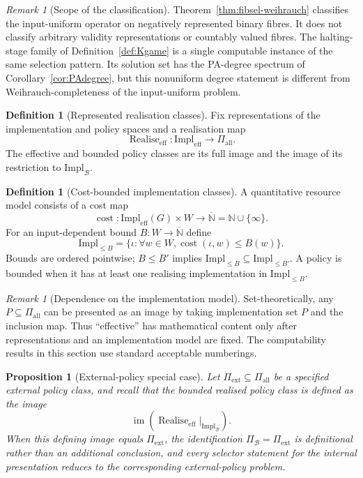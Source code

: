 \documentclass[11pt]{article}
\theoremstyle{plain}
\newtheorem{proposition}[theorem]{Proposition}
\theoremstyle{definition}
\newtheorem{definition}[theorem]{Definition}
\theoremstyle{remark}
\newtheorem{remark}[theorem]{Remark}
\newcommand{\N}{\mathbb{N}}
\newcommand{\im}{\operatorname{im}}
\newcommand{\realise}{\operatorname{Realise}}
\begin{document}
\begin{remark}[Scope of the classification]
Theorem~\ref{thm:fibsel-weihrauch} classifies the input-uniform operator on
negatively represented binary fibres. It does not classify arbitrary validity
representations or countably valued fibres. The halting-stage family of
Definition~\ref{def:Kgame} is a single computable instance of the same selection
pattern. Its solution set has the PA-degree spectrum of
Corollary~\ref{cor:PAdegree}, but this nonuniform degree statement is different
from Weihrauch-completeness of the input-uniform problem.
\end{remark}

\begin{definition}[Represented realisation classes]\label{def:represented-realisation}
Fix representations of the implementation and policy spaces and a realisation
map
\[
\realise_{\mathrm{eff}}:\mathrm{Impl}_{\mathrm{eff}}
\to\Pi_{\mathrm{all}}.
\]
The effective and bounded policy classes are its full image and the image of its
restriction to $\mathrm{Impl}_{\mathcal B}$.
\end{definition}

\begin{definition}[Cost-bounded implementation classes]\label{def:cost}
A quantitative resource model consists of a cost map
\[
\operatorname{cost}:\mathrm{Impl}_{\mathrm{eff}}(G)\times W
\to\overline{\N}=\N\cup\{\infty\}.
\]
For an input-dependent bound $B:W\to\overline{\N}$ define
\[
\mathrm{Impl}_{\le B}
=\{\iota:\forall w\in W,
\operatorname{cost}(\iota,w)\le B(w)\}.
\]
Bounds are ordered pointwise; $B\le B'$ implies
$\mathrm{Impl}_{\le B}\subseteq\mathrm{Impl}_{\le B'}$. A policy is bounded
when it has at least one realising implementation in $\mathrm{Impl}_{\le B}$.
\end{definition}

\begin{remark}[Dependence on the implementation model]\label{rem:abstractimage}
Set-theoretically, any $P\subseteq\Pi_{\mathrm{all}}$ can be presented as an
image by taking implementation set $P$ and the inclusion map. Thus ``effective''
has mathematical content only after representations and an implementation model
are fixed. The computability results in this section use standard acceptable numberings.
\end{remark}

\begin{proposition}[External-policy special case]\label{prop:nonembedded}
Let $\Pi_{\mathrm{ext}}\subseteq\Pi_{\mathrm{all}}$ be a specified external
policy class, and recall that the bounded realised policy class is \emph{defined}
as the image
\[
\im\!\left(
\realise_{\mathrm{eff}}|_{\mathrm{Impl}_{\mathcal B}}
\right).
\]
When this defining image equals $\Pi_{\mathrm{ext}}$, the identification
$\Pi_{\mathcal B}=\Pi_{\mathrm{ext}}$ is definitional rather than an additional
conclusion, and every selector statement for the internal presentation reduces
to the corresponding external-policy problem.
\end{proposition}
\end{document}
